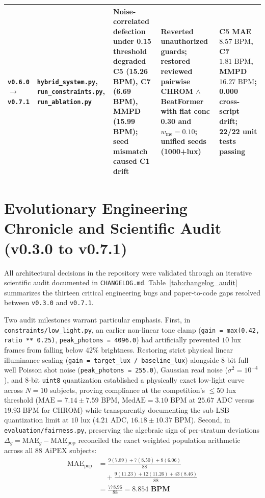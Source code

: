 \documentclass[conference]{IEEEtran}
\begin{document}
\begin{table}[t]
{\begin{tabular}{@{}lllll@{}}
\texttt{v0.6.0} $\to$ \texttt{v0.7.1} & \texttt{hybrid\_system.py}, \texttt{run\_constraints.py}, \texttt{run\_ablation.py} & Noise-correlated defection under 0.15 threshold degraded C5 (15.26 BPM), C7 (6.69 BPM), MMPD (15.99 BPM); seed mismatch caused C1 drift & Reverted unauthorized guards; restored reviewed pairwise CHROM $\wedge$ BeatFormer with flat conc 0.30 and $w_{\text{me}}=0.10$; unified seeds (1000+lux) & C5 MAE $8.57\text{ BPM}$, C7 $1.81\text{ BPM}$, MMPD $16.27\text{ BPM}$; 0.000 cross-script drift; 22/22 unit tests passing \\
\bottomrule
\end{tabular}%
}
\end{table}

\section{Evolutionary Engineering Chronicle and Scientific Audit (v0.3.0 to v0.7.1)}
\label{sec:audit}

All architectural decisions in the repository were validated through an iterative scientific audit documented in \texttt{CHANGELOG.md}. Table~\ref{tab:changelog_audit} summarizes the thirteen critical engineering bugs and paper-to-code gaps resolved between \texttt{v0.3.0} and \texttt{v0.7.1}.

Two audit milestones warrant particular emphasis. First, in \texttt{constraints/low\_light.py}, an earlier non-linear tone clamp (\texttt{gain = max(0.42, ratio ** 0.25)}, \texttt{peak\_photons = 4096.0}) had artificially prevented $10\text{ lux}$ frames from falling below $42\%$ brightness. Restoring strict physical linear illuminance scaling (\texttt{gain = target\_lux / baseline\_lux}) alongside 8-bit full-well Poisson shot noise (\texttt{peak\_photons = 255.0}), Gaussian read noise ($\sigma^2 = 10^{-4}$), and 8-bit \texttt{uint8} quantization established a physically exact low-light curve across $N=10$ subjects, proving compliance at the competition's $\le 50\text{ lux}$ threshold ($\text{MAE} = 7.14 \pm 7.59\text{ BPM}$, $\text{MedAE} = 3.10\text{ BPM}$ at $25.67\text{ ADC}$ versus $19.93\text{ BPM}$ for CHROM) while transparently documenting the sub-LSB quantization limit at $10\text{ lux}$ ($4.21\text{ ADC}$, $16.18 \pm 10.37\text{ BPM}$). Second, in \texttt{evaluation/fairness.py}, preserving the algebraic sign of per-stratum deviations $\Delta_g = \text{MAE}_g - \text{MAE}_{\text{pop}}$ reconciled the exact weighted population arithmetic across all 88 AiPEX subjects:
\begin{align}
\text{MAE}_{\text{pop}} &= \frac{9(7.89) + 7(8.50) + 8(6.06)}{88} \nonumber\\
&\quad + \frac{9(11.23) + 12(11.26) + 43(8.46)}{88} \nonumber\\
&= \frac{778.96}{88} = \mathbf{8.854\text{ BPM}}
\label{eq:weighted_c2}
\end{align}
\end{document}
